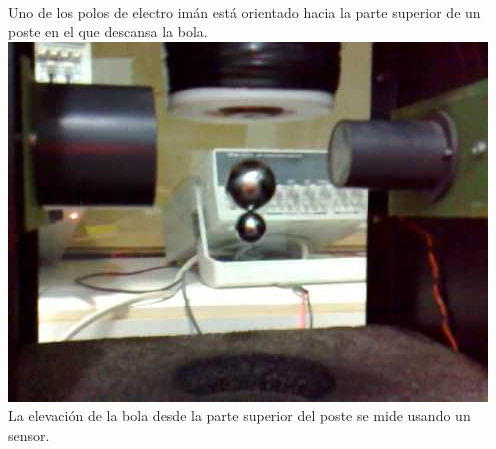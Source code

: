 \documentclass[12pt,a4paper]{book}
\begin{document}
\\
Uno de los polos de electro imán está orientado hacia la parte superior de un poste en el que descansa la bola.\\
\includegraphics[scale=1]{./3_image.jpeg}
\\
La elevación de la bola desde la parte superior del poste se mide usando un sensor. 
\end{document}

